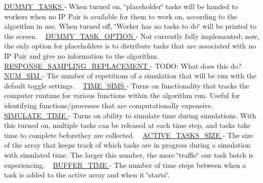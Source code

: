 \hyperlink{namespacedynamicfilterapp_1_1toggles_a16edb4f07d82f0494347a0977663e6f4}{D\+U\+M\+M\+Y\+\_\+\+T\+A\+S\+KS } -\/ When turned on, \char`\"{}placeholder\char`\"{} tasks will be handed to workers when no IP Pair is available for them to work on, according to the algorithm in use. When turned off, \char`\"{}\+Worker has no tasks to do\char`\"{} will be printed to the screen. ~\newline
 \hyperlink{namespacedynamicfilterapp_1_1toggles_a0b87eab5c4f4f0b986a43805f825d2c6}{D\+U\+M\+M\+Y\+\_\+\+T\+A\+S\+K\+\_\+\+O\+P\+T\+I\+ON } -\/ Not currently fully implemented; now, the only option for placeholders is to distribute tasks that are associated with no IP Pair and give no information to the algorithm. ~\newline
 \hyperlink{namespacedynamicfilterapp_1_1toggles_a1f569cdee80dfd4d7a2d7a3f3aebc47f}{R\+E\+S\+P\+O\+N\+S\+E\+\_\+\+S\+A\+M\+P\+L\+I\+N\+G\+\_\+\+R\+E\+P\+L\+A\+C\+E\+M\+E\+NT } -\/ T\+O\+DO\+: What does this do? ~\newline
 \hyperlink{namespacedynamicfilterapp_1_1toggles_a3baf5565851cd87736238d8dddfc1106}{N\+U\+M\+\_\+\+S\+IM } -\/ The number of repetitions of a simulation that will be run with the default toggle settings. ~\newline
 \hyperlink{namespacedynamicfilterapp_1_1toggles_a3dd608f63971ae7536ce7be96396c510}{T\+I\+M\+E\+\_\+\+S\+I\+MS } -\/ Turns on functionality that tracks the computer runtime for various functions within the algorithm run. Useful for identifying functions/processes that are computationally expensive. ~\newline
 \hyperlink{namespacedynamicfilterapp_1_1toggles_af689b6dbf6a3a082bbfb9f6decf1a805}{S\+I\+M\+U\+L\+A\+T\+E\+\_\+\+T\+I\+ME } -\/ Turns on ability to simulate time during simulations. With this turned on, multiple tasks can be released at each time step, and tasks take time to complete beforethey are collected. ~\newline
 \hyperlink{namespacedynamicfilterapp_1_1toggles_a374727dba0574510b39c1e2871f69e48}{A\+C\+T\+I\+V\+E\+\_\+\+T\+A\+S\+K\+S\+\_\+\+S\+I\+ZE } -\/ The size of the array that keeps track of which tasks are in progress during a simulation with simulated time. The larger this number, the more \char`\"{}traffic\char`\"{} our task batch is experiencing. ~\newline
 \hyperlink{namespacedynamicfilterapp_1_1toggles_a04a9eab148403f1f27d44b38211aad04}{B\+U\+F\+F\+E\+R\+\_\+\+T\+I\+ME } -\/ The number of time steps between when a task is added to the active array and when it \char`\"{}starts\char`\"{}. ~\newline
